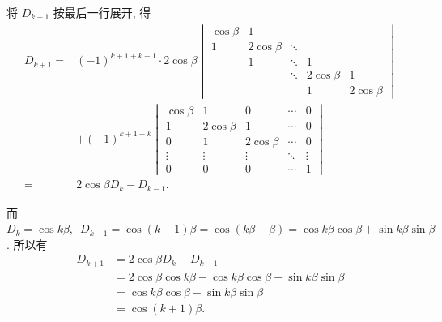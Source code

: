 \documentclass[UTF8,12pt,a4paper,fontset=fandol]{ctexart}
\begin{document}
\begin{solve}
\begin{enumerate}
            将 $D_{k+1}$ 按最后一行展开, 得
            \begin{align*}
                D_{k+1}={} & (-1)^{k+1+k+1} \cdot 2 \cos \beta
                \begin{vmatrix}
                    \cos \beta & 1            &        &              &              \\
                    1          & 2 \cos \beta & \ddots &              &              \\
                                & 1            & \ddots & 1            &              \\
                                &              & \ddots & 2 \cos \beta & 1            \\
                                &              &        & 1            & 2 \cos \beta
                \end{vmatrix} \\
                            & +(-1)^{k+1+k}
                \begin{vmatrix}
                    \cos \beta & 1            & 0            & \cdots & 0      \\
                    1          & 2 \cos \beta & 1            & \cdots & 0      \\
                    0          & 1            & 2 \cos \beta & \cdots & 0      \\
                    \vdots     & \vdots       & \vdots       & \ddots & \vdots \\
                    0          & 0            & 0            & \cdots & 1
                \end{vmatrix}       \\
                ={}        & 2\cos\beta D_k-D_{k-1}.
            \end{align*}

            而$D_{k}=\cos k \beta,\enspace
                D_{k-1}=\cos (k-1)\beta = \cos (k \beta-\beta) = \cos k \beta \cos \beta+\sin k \beta \sin \beta$. 所以有
            \begin{align*}
                D_{k+1} & = 2 \cos \beta D_{k}-D_{k-1}                                               \\
                        & =2 \cos \beta \cos k \beta-\cos k \beta \cos \beta-\sin k \beta \sin \beta \\
                        & =\cos k \beta \cos \beta-\sin k \beta \sin \beta                           \\
                        & =\cos (k+1) \beta.
            \end{align*}


\end{enumerate}
\end{solve}
\end{document}
